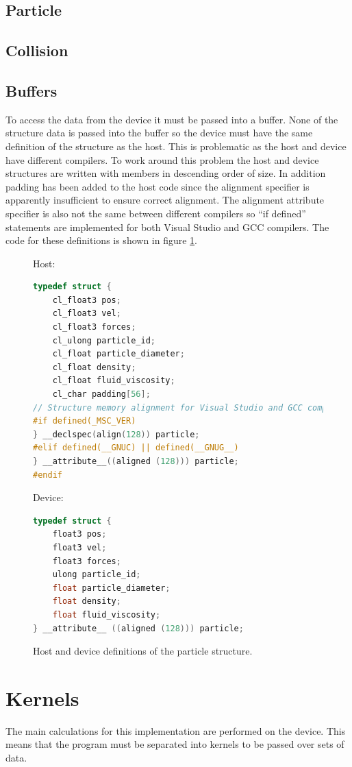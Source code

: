 \documentclass[10pt,a4paper,titlepage]{report}
\begin{document}
\subsection{Particle}
\subsection{Collision}
\subsection{Buffers}
To access the data from the device it must be passed into a buffer. None of the structure data is passed into the buffer so the device must have the same definition of the structure as the host. This is problematic as the host and device have different compilers. To work around this problem the host and device structures are written with members in descending order of size. In addition padding has been added to the host code since the alignment specifier is apparently insufficient to ensure correct alignment. The alignment attribute specifier is also not the same between different compilers so ``if defined'' statements are implemented for both Visual Studio and GCC compilers. The code for these definitions is shown in figure \ref{fig:struct_definitions}.

\begin{figure}[!ht]
Host:
\begin{lstlisting}[language=C]
typedef struct {
    cl_float3 pos;
    cl_float3 vel;
    cl_float3 forces;
    cl_ulong particle_id;
    cl_float particle_diameter;
    cl_float density;
    cl_float fluid_viscosity;
    cl_char padding[56];
// Structure memory alignment for Visual Studio and GCC compilers.
#if defined(_MSC_VER)
} __declspec(align(128)) particle;
#elif defined(__GNUC) || defined(__GNUG__)
} __attribute__((aligned (128))) particle;
#endif
\end{lstlisting}
Device:
\begin{lstlisting}[language=C]
typedef struct {
    float3 pos;
    float3 vel;
    float3 forces;
    ulong particle_id;
    float particle_diameter;
    float density;
    float fluid_viscosity;
} __attribute__ ((aligned (128))) particle;
\end{lstlisting}
\caption{Host and device definitions of the particle structure.}
\label{fig:struct_definitions}
\end{figure}
\section{Kernels}
The main calculations for this implementation are performed on the device. This means that the program must be separated into kernels to be passed over sets of data.
\end{document}
